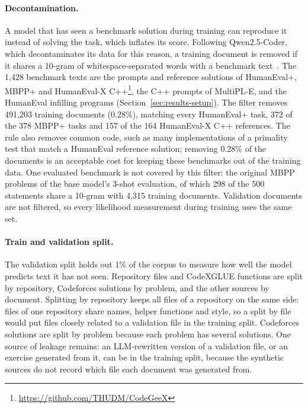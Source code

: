 \documentclass[sigconf,nonacm,balance=false]{acmart}
\begin{document}
\paragraph{Decontamination.} A model that has seen a benchmark solution during training can reproduce it instead of
solving the task, which inflates its score. Following Qwen2.5-Coder, which decontaminates its data for this reason, a
training document is removed if it shares a 10-gram of whitespace-separated words with a benchmark
text~\cite{hui2024qwen25coder}. The 1,428 benchmark texts are the prompts and reference solutions of HumanEval+,
MBPP+ and HumanEval-X C++\footnote{\url{https://github.com/THUDM/CodeGeeX}}, the C++ prompts of MultiPL-E, and the
HumanEval infilling programs (Section~\ref{sec:results-setup}). The filter removes
491,203 training documents (0.28\%), matching every HumanEval+ task, 372 of the 378 MBPP+ tasks and 157 of the 164
HumanEval-X C++ references. The rule also removes common code, such as many implementations of a primality test that
match a HumanEval reference solution; removing 0.28\% of the documents is an acceptable cost for keeping these
benchmarks out of the training data. One evaluated benchmark is not covered by this filter: the original MBPP
problems of the base model's 3-shot evaluation, of which 298 of the 500 statements share a 10-gram with 4,315 training
documents.
Validation documents are not filtered, so every likelihood measurement during training uses the same set.

\paragraph{Train and validation split.} The validation split holds out 1\% of the corpus to measure how well the
model predicts text it has not seen. Repository files and CodeXGLUE functions are split by repository, Codeforces
solutions by problem, and the other sources by document. Splitting by repository keeps all files of a repository on
the same side: files of one repository share names, helper functions and style, so a split by file would put files
closely related to a validation file in the training split. Codeforces solutions are split by problem because each
problem has several solutions. One source of leakage remains: an LLM-rewritten version of a validation file, or an
exercise generated from it, can be in the training split, because the synthetic sources do not record which file each
document was generated from.
\end{document}
